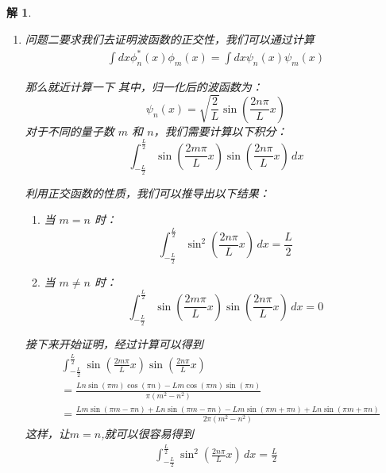 \documentclass{article}
\newtheorem{solution}{解}
\begin{document}
\begin{solution}
\begin{enumerate}
    接下来开始求解奇函数解这也就是说，我们直接令$B=0$,得到
    \begin{align*}
        \psi(x)=A\sin{kx}
    \end{align*}
    将其代入到第一个边界条件当中，可以得到
    \begin{align*}
        k_n=\frac{2n\pi}{L}
    \end{align*}

    得到波函数表达式为
    \begin{align*}
        \psi_n(x)=A_n\sin{\frac{2n\pi}{L}x}
    \end{align*}

    进行归一化，得到波函数表达式为
    \begin{align*}
        \psi_n(x)=\sqrt{\frac{2}{L}}\sin{\frac{2n\pi}{L}x}
    \end{align*}
    \item[(2)] 问题二要求我们去证明波函数的正交性，我们可以通过计算
    \begin{align*}
        \int dx \phi_n^{*}(x)\phi_m(x)=\int dx \psi_n(x)\psi_m(x)
    \end{align*}

    那么就近计算一下
    其中，归一化后的波函数为： 
    \[ 
        \psi_n(x) = \sqrt{\frac{2}{L}} \sin\left(\frac{2n\pi}{L} x\right) 
    \] 
    对于不同的量子数 $ m $ 和 $ n $，我们需要计算以下积分： 
    \[ 
        \int_{-\frac{L}{2}}^{\frac{L}{2}} \sin\left(\frac{2m\pi}{L} x\right) \sin\left(\frac{2n\pi}{L} x\right) \, dx 
    \] 
    
    利用正交函数的性质，我们可以推导出以下结果： 
    \begin{enumerate}
        \item 当 $ m = n $ 时： 
        \[ 
            \int_{-\frac{L}{2}}^{\frac{L}{2}} \sin^2\left(\frac{2n\pi}{L} x\right) \, dx = \frac{L}{2}
         \]
        \item 当 $ m \ne n $ 时： 
        \[ 
            \int_{-\frac{L}{2}}^{\frac{L}{2}} \sin\left(\frac{2m\pi}{L} x\right) \sin\left(\frac{2n\pi}{L} x\right) \, dx = 0 
        \] 
    \end{enumerate}
    
    接下来开始证明，经过计算可以得到
    \begin{align*}
        &\int_{-\frac{L}{2}}^{\frac{L}{2}} \sin\left(\frac{2m\pi}{L} x\right) \sin\left(\frac{2n\pi}{L} x\right)\\
        &=\frac{L n \sin (\pi  m) \cos (\pi  n)-L m \cos (\pi  m) \sin (\pi  n)}{\pi  \left(m^2-n^2\right)}\\
        &=\frac{L m \sin (\pi  m-\pi  n)+L n \sin (\pi  m-\pi  n)-L m \sin (\pi  m+\pi  n)+L n \sin (\pi  m+\pi  n)}{2 \pi  \left(m^2-n^2\right)}
    \end{align*}
    这样，让$m=n$,就可以很容易得到
    \begin{align*}
        \int_{-\frac{L}{2}}^{\frac{L}{2}} \sin^2\left(\frac{2n\pi}{L} x\right) \, dx = \frac{L}{2}
    \end{align*}
    

\end{enumerate}
\end{solution}
\end{document}
